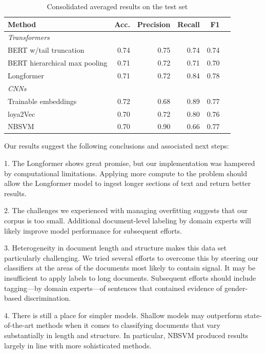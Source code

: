 \documentclass[twocolumn,10pt]{wmrDoc}
\begin{document}
\begin{table}
 \caption{Consolidated averaged results on the test set}
  \centering
  \begin{tabular}{lrrrrr}
    \toprule
    Method & Acc. & Precision & Recall & F1\\
    \midrule
    \em Transformers \\
    BERT w/tail truncation         & 0.74 & 0.75 & 0.74 & 0.74 \\
    BERT hierarchical max pooling & 0.71 & 0.72 & 0.71 & 0.70 \\
    Longformer                     & 0.71 & 0.72 & 0.84 & 0.78 \\
    \midrule
    \em CNNs\\
    Trainable embeddings           & 0.72 & 0.68 & 0.89 & 0.77 \\
    loya2Vec                       & 0.70 & 0.72 & 0.80 & 0.76 \\
    \midrule
    NBSVM                          & 0.70 & 0.90 & 0.66 & 0.77 \\
    \bottomrule
  \end{tabular}
  \label{tab:conclusion}
\end{table}

Our results suggest the following conclusions and associated next steps:

1. The Longformer shows great promise, but our implementation was hampered by computational limitations.  Applying more compute to the problem should allow the Longformer model to ingest longer sections of text and return better results.

2. The challenges we experienced with managing overfitting suggests that our corpus is too small.  Additional document-level labeling by domain experts will likely improve model performance for subsequent efforts.

3. Heterogeneity in document length and structure makes this data set particularly challenging.  We tried several efforts to overcome this by steering our classifiers at the areas of the documents most likely to contain signal.  It may be insufficient to apply labels to long documents.  Subsequent efforts should include tagging---by domain experts---of sentences that contained evidence of gender-based discrimination.

4. There is still a place for simpler models.   Shallow models may outperform state-of-the-art methods when it comes to classifying documents that vary substantially in length and structure.  In particular, NBSVM produced results largely in line with more sohisticated methods.
\end{document}
